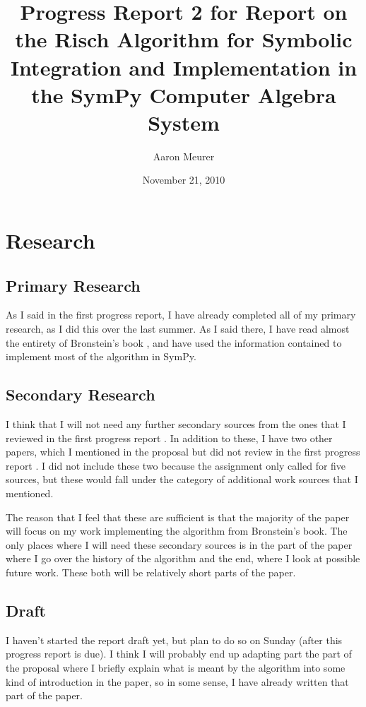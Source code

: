 \documentclass[12pt]{article}
\begin{document}
\title{Progress Report 2 for Report on the Risch Algorithm for Symbolic
Integration and Implementation in the Sym\-Py Computer Algebra System}
\author{Aaron Meurer}
\date{November 21, 2010}
\maketitle


\section{Research}
\subsection{Primary Research}
As I said in the first progress report, I have already completed all of
my primary research, as I did this over the last summer.  As I said
there, I have read almost the entirety of Bronstein's book
\cite{bronstein2005symbolic}, and have used the information contained to
implement most of the algorithm in Sym\-Py.

\subsection{Secondary Research}
I think that I will not need any further secondary sources from the ones
that I reviewed in the first progress report
\cite{bronstein1989simplification, davenport1984integration,
kauers2008integration, moses1971symbolic, risch1969problem}.  In
addition to these, I have two other papers, which I mentioned in the
proposal but did not review in the first progress report
\cite{roach1997meijerg, adamchik1990hypergeometric}.  I did not include
these two because the assignment only called for five sources, but these
would fall under the category of additional work sources that I
mentioned.

The reason that I feel that these are sufficient is that the majority of
the paper will focus on my work implementing the algorithm from
Bronstein's book.  The only places where I will need these secondary
sources is in the part of the paper where I go over the history of the
algorithm and the end, where I look at possible future work.  These both
will be relatively short parts of the paper.

\subsection{Draft}
I haven't started the report draft yet, but plan to do so on Sunday
(after this progress report is due).  I think I will probably end up
adapting part the part of the proposal where I briefly explain what is
meant by the algorithm into some kind of introduction in the paper, so
in some sense, I have already written that part of the paper.



\end{document}
